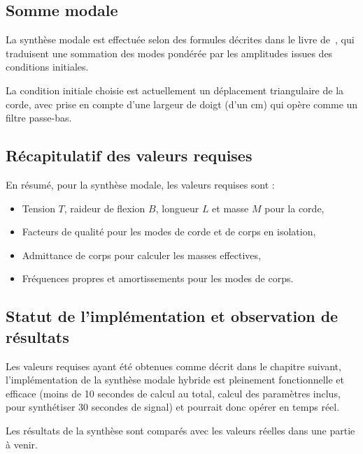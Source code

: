 \subsection{Somme modale}

  La synthèse modale est effectuée selon des formules décrites
dans le livre de~\textcite{newland}, qui traduisent une sommation des modes
pondérée par les amplitudes issues des conditions initiales.

  La condition initiale choisie est actuellement un déplacement triangulaire
de la corde, avec prise en compte d'une largeur de doigt (d'un \( \si{\cm} \))
qui opère comme un filtre passe-bas.

\subsection{Récapitulatif des valeurs requises}

En résumé, pour la synthèse modale, les valeurs requises sont :
\begin{itemize}
 \item Tension \( T \), raideur de flexion \( B \), longueur \( L \) et
  masse \( M \) pour la corde,
 \item Facteurs de qualité pour les modes de corde et de corps en isolation,
 \item Admittance de corps pour calculer les masses effectives,
 \item Fréquences propres et amortissements pour les modes de corps.
\end{itemize}

\subsection{Statut de l'implémentation et observation de résultats}

Les valeurs requises ayant été obtenues comme décrit dans le chapitre suivant,
l'implémentation de la synthèse modale hybride est pleinement fonctionnelle
et efficace (moins de 10 secondes de calcul au total, calcul des paramètres
inclus, pour synthétiser 30 secondes de signal) et pourrait donc opérer en
temps réel.

Les résultats de la synthèse sont comparés avec les valeurs réelles dans une
partie à venir.

  
% 

